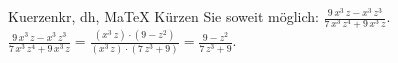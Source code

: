 \begin{MAufgabe}{Kuerzen}{kr, dh, MaTeX}
K\"urzen Sie soweit m\"oglich: $\frac{9\, x^3\, z - x^3\, z^3}{7\, x^3\, z^4 + 9\, x^3\, z}$.\\ 
\ifLsg\MLoesung
\quad $\frac{9\, x^3\, z - x^3\, z^3}{7\, x^3\, z^4 + 9\, x^3\, z}=\frac{(x^3\, z)\cdot(9 - z^2)}{(x^3\, z)\cdot(7\, z^3 + 9)}=\frac{9 - z^2}{7\, z^3 + 9}$.\else\relax\fi
 \end{MAufgabe}